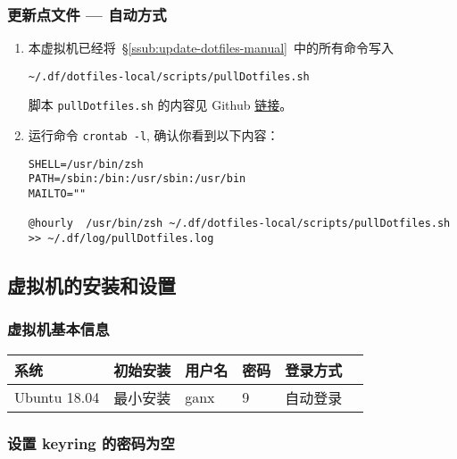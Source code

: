 \documentclass[
    11pt,
    base=hide,
    cite=authoryear,
    device=phone,
    lang=cn,
    mode=simple,
    result=answer,
    toc=onecol,
]{elegantbook_sierxue}
\begin{document}
\subsubsection{更新点文件 --- 自动方式}%
\label{ssub:update-dotfiles-crontab}

\begin{enumerate}
    \item 本虚拟机已经将~\S\ref{ssub:update-dotfiles-manual}~中的所有命令写入
\begin{lstlisting}[escapeinside=``]
~/.df/dotfiles-local/scripts/pullDotfiles.sh
\end{lstlisting}
        脚本 \lstinline{pullDotfiles.sh} 的内容见 Github
        \href{https://github.com/ddpom/scripts/blob/master/pullDotfiles.sh}
        {链接}。
    \item 运行命令 \lstinline{crontab -l}, 确认你看到以下内容：
\begin{lstlisting}[escapeinside=``]
SHELL=/usr/bin/zsh
PATH=/sbin:/bin:/usr/sbin:/usr/bin
MAILTO=""

@hourly  /usr/bin/zsh ~/.df/dotfiles-local/scripts/pullDotfiles.sh >> ~/.df/log/pullDotfiles.log
\end{lstlisting}
\end{enumerate}

\subsection{虚拟机的安装和设置}%
\label{sub:vbox-vm-install-set}

\subsubsection{虚拟机基本信息}%
\label{ssub:linux-ubuntu}

\begin{table}[H]
   \centering
     \begin{tabular}{llllll}
     \toprule
     系统 & 初始安装 & 用户名 & 密码 & 登录方式 \\
     \midrule
     Ubuntu 18.04 & 最小安装 & ganx   & 9 & 自动登录\\
     \bottomrule
     \end{tabular}%
   \label{tab:theorem-class}%
\end{table}%

\subsubsection{设置 keyring 的密码为空}%
\label{ssub:vm-keyring}
\end{document}
